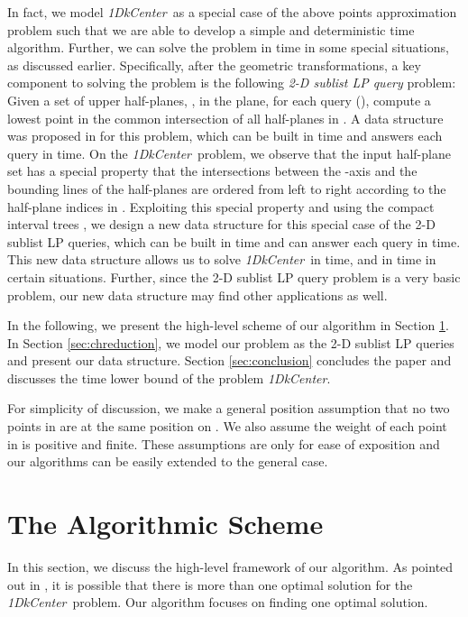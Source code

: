 \documentclass{llncs}
\def\problem{{\it 1DkCenter}}
\begin{document}
In fact, we model \problem\ as a special case of the above points approximation problem such that we are able to develop a simple and deterministic  time algorithm. Further, we can solve the problem in  time in some special situations, as discussed earlier.
Specifically, after the
geometric transformations, a key component to solving the problem is
the following {\em 2-D
sublist LP query} problem: Given a set of  upper half-planes,
, in the plane, for each query 
(), compute a lowest point  in the common
intersection of all half-planes in . A data structure was proposed in \cite{ref:ChenAp091} for this
problem, which can be built in  time and answers each
query in  time.
On the \problem\ problem, we observe that the input half-plane
set  has a special property that the intersections between the
-axis and the bounding lines of the half-planes are
ordered from left to right according to the half-plane indices in . Exploiting
this special property and using the compact
interval trees \cite{ref:GuibasCo91},
we design a new data structure for this special case of the 2-D
sublist LP queries, which can be built in
 time and can answer each query in 
time. This new data structure allows us to solve \problem\ in
 time, and in  time in certain situations.
Further, since the 2-D sublist LP query problem
is a very basic problem, our new data structure may find other applications as
well.





In the following, we present the high-level scheme of our algorithm
in Section \ref{sec:algorithms}. In Section
\ref{sec:chreduction}, we model our problem as the
2-D sublist LP queries and present our data structure.
Section \ref{sec:conclusion} concludes the
paper and discusses the  time lower bound of the problem \problem.


For simplicity of discussion, we make a general position assumption that no two
points in  are at the same position on . We also assume the
weight of each point in  is positive and finite. These
assumptions are only for ease of exposition and our algorithms can
be easily extended to the general case.

\section{The Algorithmic Scheme}
\label{sec:algorithms}

In this section, we discuss the high-level framework
of our algorithm. As pointed out in
\cite{ref:BhattacharyaOp07}, it is possible that there is more than
one optimal solution for the \problem\ problem.
Our algorithm focuses on finding one optimal solution.
\end{document}

